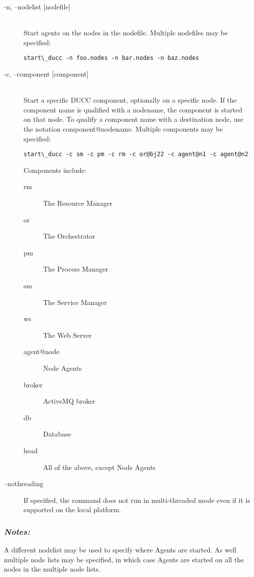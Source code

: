       \begin{description}

        \item[-n, --nodelist {[nodefile] }] \hfill \\
          Start agents on the nodes in the nodefile. Multiple nodefiles may be specified: 
\begin{verbatim}
start\_ducc -n foo.nodes -n bar.nodes -n baz.nodes 
\end{verbatim}
          

        \item[-c, --component {[component] }] \hfill \\
          Start a specific DUCC component, optionally on a specific node. If the component 
          name is qualified with a nodename, the component is started on that node. To qualify 
          a component name with a destination node, use the notation component@nodename. 
          Multiple components may be specified: 
\begin{verbatim}
start\_ducc -c sm -c pm -c rm -c or@bj22 -c agent@n1 -c agent@n2 
\end{verbatim}
          
          Components include: 
          \begin{description}
            \item[rm] The Resource Manager
            \item[or]The Orchestrator
            \item[pm]The Process Manager
            \item[sm]The Service Manager
            \item[ws]The Web Server
            \item[agent@node] Node Agents
            \item[broker] ActiveMQ broker
            \item[db] Database
            \item[head] All of the above, except Node Agents
          \end{description}

          \item[--nothreading] If specified, the command does not run in multi-threaded mode
            even if it is supported on the local platform.

      \end{description}

      \subsubsection{{\em Notes: }}
      A different nodelist may be used to specify where Agents are started. As well multiple node 
      lists may be specified, in which case Agents are started on all the nodes in the multiple node 
      lists. 
      
